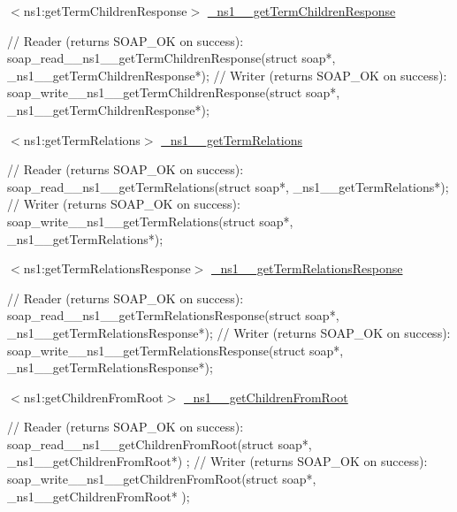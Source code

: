 \begin{DoxyItemize}
\item $<$ns1:getTermChildrenResponse$>$ \hyperlink{class__ns1____getTermChildrenResponse}{\_\-ns1\_\-\_\-getTermChildrenResponse} 
\begin{DoxyCode}
    // Reader (returns SOAP_OK on success):
    soap_read__ns1__getTermChildrenResponse(struct soap*, 
      _ns1__getTermChildrenResponse*);
    // Writer (returns SOAP_OK on success):
    soap_write__ns1__getTermChildrenResponse(struct soap*, 
      _ns1__getTermChildrenResponse*);
\end{DoxyCode}

\end{DoxyItemize}


\begin{DoxyItemize}
\item $<$ns1:getTermRelations$>$ \hyperlink{class__ns1____getTermRelations}{\_\-ns1\_\-\_\-getTermRelations} 
\begin{DoxyCode}
    // Reader (returns SOAP_OK on success):
    soap_read__ns1__getTermRelations(struct soap*, _ns1__getTermRelations*);
    // Writer (returns SOAP_OK on success):
    soap_write__ns1__getTermRelations(struct soap*, _ns1__getTermRelations*);
\end{DoxyCode}

\end{DoxyItemize}


\begin{DoxyItemize}
\item $<$ns1:getTermRelationsResponse$>$ \hyperlink{class__ns1____getTermRelationsResponse}{\_\-ns1\_\-\_\-getTermRelationsResponse} 
\begin{DoxyCode}
    // Reader (returns SOAP_OK on success):
    soap_read__ns1__getTermRelationsResponse(struct soap*, 
      _ns1__getTermRelationsResponse*);
    // Writer (returns SOAP_OK on success):
    soap_write__ns1__getTermRelationsResponse(struct soap*, 
      _ns1__getTermRelationsResponse*);
\end{DoxyCode}

\end{DoxyItemize}


\begin{DoxyItemize}
\item $<$ns1:getChildrenFromRoot$>$ \hyperlink{class__ns1____getChildrenFromRoot}{\_\-ns1\_\-\_\-getChildrenFromRoot} 
\begin{DoxyCode}
    // Reader (returns SOAP_OK on success):
    soap_read__ns1__getChildrenFromRoot(struct soap*, _ns1__getChildrenFromRoot*)
      ;
    // Writer (returns SOAP_OK on success):
    soap_write__ns1__getChildrenFromRoot(struct soap*, _ns1__getChildrenFromRoot*
      );
\end{DoxyCode}

\end{DoxyItemize}


